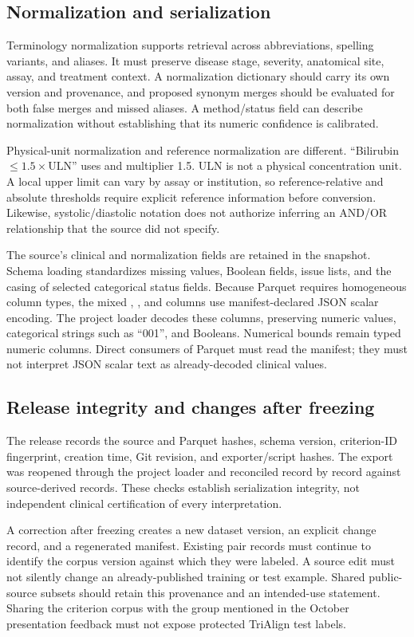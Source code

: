 \documentclass[10pt,letterpaper]{article}
\newcommand{\code}[1]{\texttt{\detokenize{#1}}}
\begin{document}
\subsection{Normalization and serialization}
Terminology normalization supports retrieval across abbreviations, spelling
variants, and aliases. It must preserve disease stage, severity, anatomical
site, assay, and treatment context. A normalization dictionary should carry
its own version and provenance, and proposed synonym merges should be evaluated
for both false merges and missed aliases. A method/status field can describe
normalization without establishing that its numeric confidence is calibrated.

Physical-unit normalization and reference normalization are different.
``Bilirubin $\leq1.5\times\mathrm{ULN}$'' uses \code{reference_type=ULN}
and multiplier 1.5. ULN is not a physical concentration unit. A local upper
limit can vary by assay or institution, so reference-relative and absolute
thresholds require explicit reference information before conversion.
Likewise, systolic/diastolic notation does not authorize inferring an AND/OR
relationship that the source did not specify.

The source's clinical and normalization fields are retained in the snapshot.
Schema loading standardizes missing values, Boolean fields, issue lists, and
the casing of selected categorical status fields. Because Parquet requires
homogeneous column types, the mixed \code{value}, \code{value_raw}, and
\code{value_normalized} columns use manifest-declared JSON scalar encoding.
The project loader decodes these columns, preserving numeric values,
categorical strings such as ``001'', and Booleans. Numerical bounds remain
typed numeric columns. Direct consumers of Parquet must read the manifest;
they must not interpret JSON scalar text as already-decoded clinical values.

\subsection{Release integrity and changes after freezing}
The release records the source and Parquet hashes, schema version, criterion-ID
fingerprint, creation time, Git revision, and exporter/script hashes. The
export was reopened through the project loader and reconciled record by
record against source-derived records. These checks establish serialization
integrity, not independent clinical certification of every interpretation.

A correction after freezing creates a new dataset version, an explicit change
record, and a regenerated manifest. Existing pair records must continue to
identify the corpus version against which they were labeled. A source edit
must not silently change an already-published training or test example.
Shared public-source subsets should retain this provenance and an intended-use
statement. Sharing the criterion corpus with the group mentioned in the
October presentation feedback must not expose protected TriAlign test labels.
\end{document}
